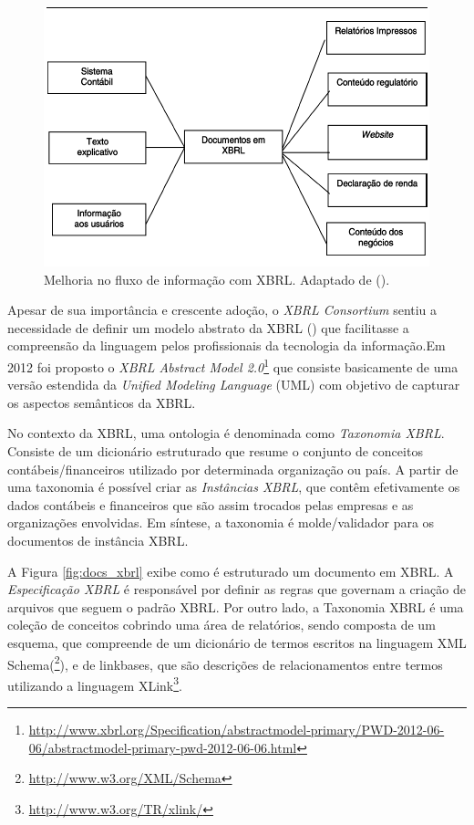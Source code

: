 \documentclass[msc,proposal,hidelot,hideabstract]{ppgccufmg} %
\begin{document}
\begin{figure}[hbtp]
\centering
\includegraphics[width=.75\textwidth]{img/fluxo_info_xbrl.png}
\caption{Melhoria no fluxo de informação com XBRL. Adaptado de (\cite{hoffman2001xbrl}).}
\label{fig:fluxo_info_xbrl}
\end{figure}

Apesar de sua importância e crescente adoção, o \textit{XBRL Consortium} sentiu a necessidade de definir um modelo abstrato da XBRL (\cite{xbrl_preserve_promote_particite}) que facilitasse a compreensão da linguagem pelos profissionais da tecnologia da informação.Em 2012 foi proposto o \textit{XBRL Abstract Model 2.0}\footnote{\url{http://www.xbrl.org/Specification/abstractmodel-primary/PWD-2012-06-06/abstractmodel-primary-pwd-2012-06-06.html}} que consiste basicamente de uma versão estendida da \textit{Unified Modeling Language} (UML)\cite{booch2000uml} com objetivo de capturar os aspectos semânticos da XBRL.

No contexto da XBRL, uma ontologia é denominada como \textit{Taxonomia XBRL}{}. Consiste de um dicionário estruturado que resume o conjunto de conceitos contábeis/financeiros utilizado por determinada organização ou país. A partir de uma taxonomia é possível criar as \textit{Instâncias XBRL}, que contêm efetivamente os dados contábeis e financeiros que são assim trocados pelas empresas e as organizações envolvidas. Em síntese, a taxonomia é molde/validador para os documentos de instância XBRL.

A Figura \ref{fig:docs_xbrl} exibe como é estruturado um documento em XBRL. A \textit{Especificação XBRL} é responsável por definir as regras que governam a criação de arquivos
que seguem o padrão XBRL. Por outro lado, a Taxonomia XBRL é uma coleção de conceitos cobrindo uma área
de relatórios, sendo composta de um esquema, que compreende de um dicionário de termos escritos na linguagem XML Schema(\footnote{\url{http://www.w3.org/XML/Schema}}), e de linkbases, que são descrições de relacionamentos entre termos utilizando a linguagem XLink\footnote{\url{http://www.w3.org/TR/xlink/}}.
\end{document}
